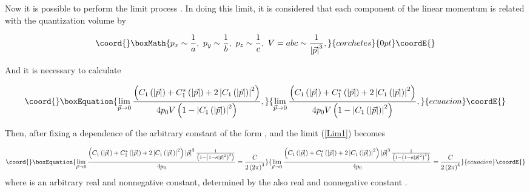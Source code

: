 \documentclass[12pt,letterpaper]{report}
\begin{document}
Now it is possible to perform the limit process
\coordHE{}. In doing this limit, it is considered that
each component of the linear momentum \coordHE{} is related with
the quantization volume by

\[\coord{}\boxMath{
p_x\sim \frac 1a,\ p_y\sim \frac 1b,\ p_z\sim \frac 1c,\ V=abc\sim
\frac 1{\left| \vec{p}\right| ^3},
}{corchetes}{0pt}\coordE{}\]
\myHighlight{$\ \ $}\coordHE{}

And it is necessary to calculate

\begin{equation}\coord{}\boxEquation{
\lim_{\vec{p}\rightarrow 0}\frac{\left(C_1\left(\left|
\vec{p}\right| \right) +C_1^{*}\left(\left| \vec{p}\right| \right)
+2\left| C_1\left(\left| \vec{p}\right| \right) \right| ^2\right)
}{4p_0V\left(1-\left| C_1\left(\left| \vec{p}\right| \right)
\right| ^2\right) },\label{Lim1}
}{
\lim_{\vec{p}\rightarrow 0}\frac{\left(C_1\left(\left|
\vec{p}\right| \right) +C_1^{*}\left(\left| \vec{p}\right| \right)
+2\left| C_1\left(\left| \vec{p}\right| \right) \right| ^2\right)
}{4p_0V\left(1-\left| C_1\left(\left| \vec{p}\right| \right)
\right| ^2\right) },}{ecuacion}\coordE{}\end{equation}

Then, after fixing a dependence of the arbitrary constant \coordHE{} of
the form \coordHE{},
and \coordHE{} the limit (\ref{Lim1}) becomes

\begin{equation}\coord{}\boxEquation{
\lim_{\vec{p}\rightarrow 0}\frac{\left(C_1\left(\left|
\vec{p}\right| \right) +C_1^{*}\left(\left| \vec{p}\right| \right)
+2\left| C_1\left(\left| \vec{p}\right| \right) \right| ^2\right)
\left| \vec{p}\right| ^3\frac 1{\left(1-\left(1-\kappa \left|
\vec{p}\right| ^2\right) ^2\right) }}{4p_0}=\frac C{2\left(2\pi
\right) ^4}
}{
\lim_{\vec{p}\rightarrow 0}\frac{\left(C_1\left(\left|
\vec{p}\right| \right) +C_1^{*}\left(\left| \vec{p}\right| \right)
+2\left| C_1\left(\left| \vec{p}\right| \right) \right| ^2\right)
\left| \vec{p}\right| ^3\frac 1{\left(1-\left(1-\kappa \left|
\vec{p}\right| ^2\right) ^2\right) }}{4p_0}=\frac C{2\left(2\pi
\right) ^4}
}{ecuacion}\coordE{}\end{equation}
where \coordHE{} is an arbitrary real and nonnegative constant,
determined by the also real and nonnegative constant \myHighlight{$\kappa$}\coordHE{}.
\end{document}
